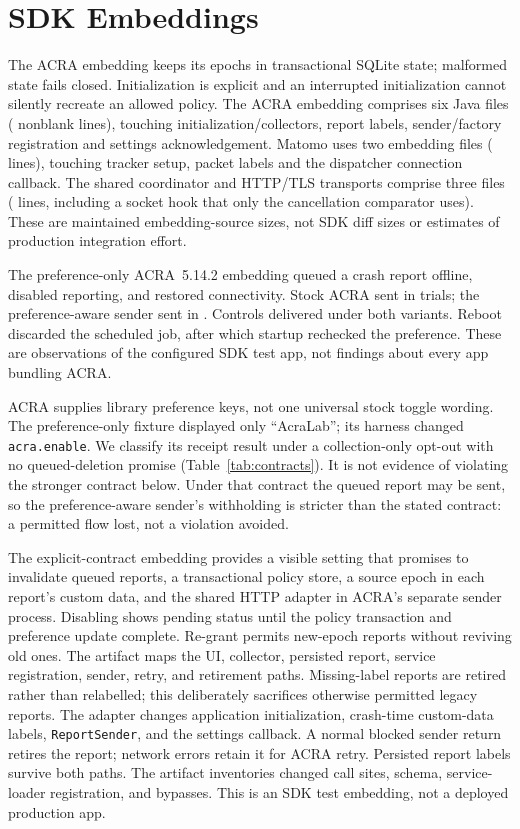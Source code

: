 \section{SDK Embeddings}
\label{app:sdk}
The ACRA embedding keeps its epochs in transactional SQLite state; malformed state fails closed. Initialization is
explicit and an interrupted initialization cannot silently recreate an allowed policy. The ACRA embedding comprises six
Java files (\sdkAcraLoc{} nonblank lines), touching initialization/collectors, report labels, sender/factory registration and
settings acknowledgement. Matomo uses two embedding files (\sdkMatomoLoc{} lines), touching tracker setup, packet labels and the
dispatcher connection callback. The shared coordinator and HTTP/TLS transports comprise three files (\sdkTransportLoc{}
lines, including a socket hook that only the cancellation comparator uses). These
are maintained embedding-source sizes, not SDK diff sizes or estimates of production integration effort.

The preference-only ACRA~5.14.2 embedding queued a crash report offline, disabled reporting,
and restored connectivity. Stock ACRA sent in \acraStockLeak{} trials; the preference-aware
sender sent in \acraFenceLeak{}. Controls delivered under both variants. Reboot discarded
the scheduled job, after which startup rechecked the preference. These are observations
of the configured SDK test app, not findings about every app bundling ACRA.

ACRA supplies library preference keys, not one universal stock toggle wording. The preference-only fixture displayed
only ``AcraLab''; its harness changed \texttt{acra.enable}. We classify its \acraStockLeak{} receipt result under a
collection-only opt-out with no queued-deletion promise (Table~\ref{tab:contracts}). It is not evidence of violating the
stronger contract below. Under that contract the queued report may be sent, so the preference-aware sender's withholding
is stricter than the stated contract: a permitted flow lost, not a violation avoided.

The explicit-contract embedding provides a visible setting that promises to invalidate queued reports,
a transactional policy store, a source epoch in each report's custom data, and the shared
HTTP adapter in ACRA's separate sender process. Disabling shows pending status until the
policy transaction and preference update complete. Re-grant permits new-epoch reports
without reviving old ones. The artifact maps the UI, collector, persisted report, service
registration, sender, retry, and retirement paths. Missing-label reports are retired rather
than relabelled; this deliberately sacrifices otherwise permitted legacy reports.
The adapter changes application initialization, crash-time custom-data labels, \texttt{ReportSender}, and the settings
callback. A normal blocked sender return retires the report; network errors retain it for ACRA retry. Persisted report
labels survive both paths. The artifact inventories changed call sites, schema, service-loader registration, and
bypasses. This is an SDK test embedding, not a deployed production app.

